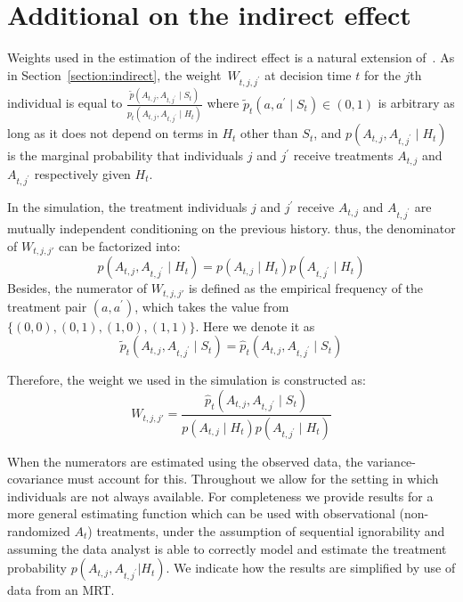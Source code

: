 \documentclass[12pt]{article}
\begin{document}
\section{Additional on the indirect effect}
\label{app:addindirect}

Weights used in the estimation of the indirect effect is a natural extension of~\cite{Boruvkaetal}. As in Section~\ref{section:indirect}, the weight~$W_{t,j, j^\prime}$ at decision time $t$ for the $j$th individual is equal to $\frac{\tilde p (A_{t,j}, A_{t,j^\prime} \mid S_t)}{p_t (A_{t,j}, A_{t,j^\prime} \mid H_t)}$ where $\tilde p_t (a, a^\prime \mid S_t)\in (0,1)$ is arbitrary as long as it does not depend on terms in $H_t$ other than $S_t$, and $p(A_{t,j}, A_{t,j^\prime} \mid H_t)$ is the marginal probability that individuals $j$ and $j^\prime$ receive treatments $A_{t,j}$ and $A_{t,j^\prime}$ respectively given $H_t$.

In the simulation, the treatment individuals $j$ and $j^\prime$ receive $A_{t,j}$ and $A_{t,j^\prime}$ are mutually independent conditioning on the previous history. thus, the denominator of $W_{t,j,j\prime}$ can be factorized into:
\[ p(A_{t,j}, A_{t,j^\prime} \mid H_t)= p(A_{t,j} \mid H_t)p(A_{t,j^\prime} \mid H_t) \]
Besides, the numerator of  $W_{t,j,j\prime}$ is defined as the empirical frequency of the treatment pair $ (a, a^\prime)$, which takes the value from $\{(0,0),(0,1),(1,0),(1,1)\}$. Here we denote it as \[\tilde p_t (A_{t,j}, A_{t,j^\prime} \mid S_t) = \hat p_t (A_{t,j}, A_{t,j^\prime} \mid S_t)\]

Therefore, the weight we used in the simulation is constructed as:
\[
W_{t,j,j\prime} = \frac{\hat p_t (A_{t,j}, A_{t,j^\prime} \mid S_t)}{p(A_{t,j} \mid H_t)p(A_{t,j^\prime} \mid H_t)}
\]

When the numerators are estimated using the observed data, the variance-covariance must account for this. Throughout we allow for the setting in which individuals are not always available. For completeness we provide results for a more general estimating function which can be used with observational (non-randomized $A_t$) treatments, under the assumption of sequential ignorability and assuming the data analyst is able to correctly model and estimate the treatment probability $p\left(A_{t,j}, A_{t,j^\prime}| H_t\right)$. We indicate how the results are simplified by use of data from an MRT.
\end{document}
